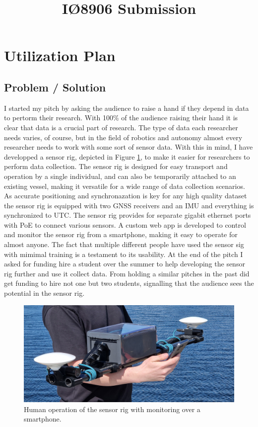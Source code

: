 \documentclass{iopconfser}
\begin{document}
\title{IØ8906 Submission}

\section*{Utilization Plan}
\subsection*{Problem / Solution}
I started my pitch by asking the audience to raise a hand if they depend in data to pertorm their research.
With 100\% of the audience raising their hand it is clear that data is a crucial part of research.
The type of data each researcher needs varies, of course, but in the field of robotics and autonomy almost every researcher needs to work with some sort of sensor data.
With this in mind, I have developped a sensor rig, depicted in Figure \ref{fig:operation}, to make it easier for researchers to perform data collection.
The sensor rig is designed for easy transport and operation by a single individual, and can also be temporarily attached to an existing vessel, making it versatile for a wide range of data collection scenarios.
As accurate positioning and synchronazation is key for any high quality dataset the sensor rig is equipped with two GNSS receivers and an IMU and everything is synchronized to UTC.
The sensor rig provides for separate gigabit ethernet ports with PoE to connect various sensors.
A custom web app is developed to control and monitor the sensor rig from a smartphone, making it easy to operate for almost anyone.
The fact that multiple different people have used the sensor sig with mimimal training is a testament to its usability.
At the end of the pitch I asked for funding hire a student over the summer to help developing the sensor rig further and use it collect data.
From holding a similar pitches in the past did get funding to hire not one but two students, signalling that the audience sees the potential in the sensor rig.


\begin{figure}[H]
    \centering
    \includegraphics[trim={0 1cm 0 1cm},clip,width=\textwidth]{figures/operation.jpg}
    \caption{Human operation of the sensor rig with monitoring over a smartphone. \label{fig:operation}}
\end{figure}
\end{document}

